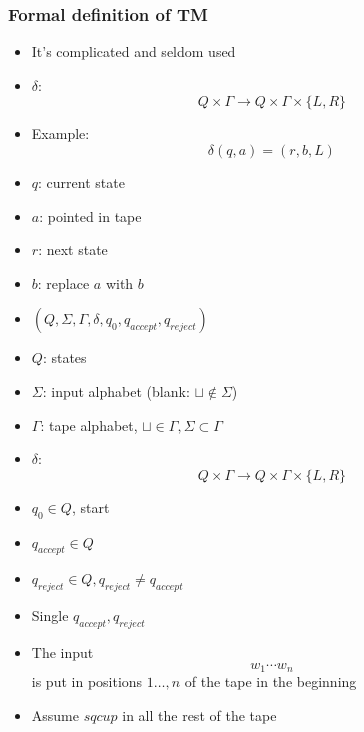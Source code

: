 \begin{frame}[allowframebreaks] \frametitle{Formal definition of TM}
  \begin{itemize}
\item It's complicated and seldom used
\item $\delta$:
  \begin{equation*}
  Q\times \Gamma\rightarrow 
Q\times \Gamma \times\{L,R\}
\end{equation*}
\item Example:
  \begin{equation*}
  \delta(q,a) = (r,b,L)
\end{equation*}
\item [] $q$: current state

\item [] $a$: pointed in tape

\item [] $r$: next state

\item [] $b$: replace $a$ with $b$
\item $(Q,\Sigma, \Gamma, \delta, q_0, q_{accept},
q_{reject})$

\item [] $Q$: states

\item [] $\Sigma$: input alphabet (blank: $\sqcup \notin \Sigma$)

\item [] $\Gamma$: tape alphabet, $\sqcup \in \Gamma, 
\Sigma \subset \Gamma$

\item [] $\delta$:
  \begin{equation*}
  Q\times \Gamma \rightarrow
Q \times \Gamma \times 
\{L,R\}
\end{equation*}
\item [] $q_0 \in Q$, start

\item [] $q_{accept} \in Q$

\item [] $q_{reject} \in Q, q_{reject} \neq q_{accept}$

\item [] Single $q_{accept}, q_{reject}$

\item The input
  \begin{equation*}
  w_1\cdots w_n
\end{equation*}
is put in 
  positions $1 \ldots, n$ of the tape in the beginning

\item [] Assume $sqcup$ in all the rest of the tape
  
\end{itemize}\end{frame}

